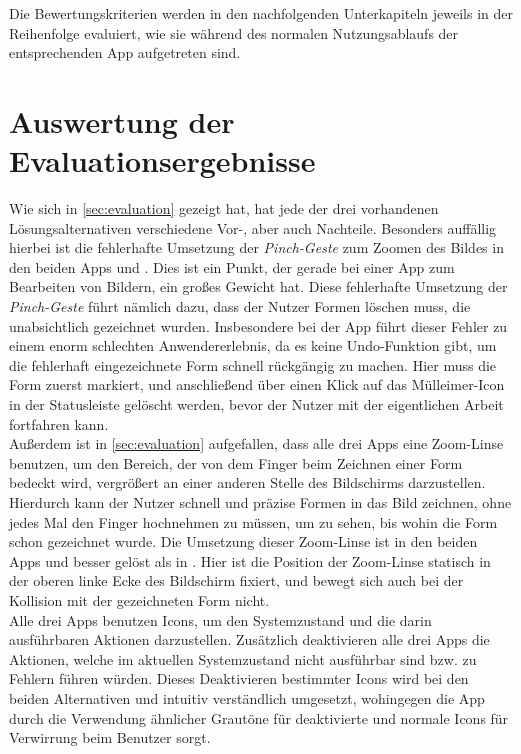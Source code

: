 Die Bewertungskriterien werden in den nachfolgenden Unterkapiteln jeweils in der Reihenfolge evaluiert, wie sie während des normalen Nutzungsablaufs der entsprechenden App aufgetreten sind.




\section{Auswertung der Evaluationsergebnisse}


Wie sich in \autoref{sec:evaluation} gezeigt hat, hat jede der drei vorhandenen Lösungsalternativen verschiedene Vor-, aber auch Nachteile.
Besonders auffällig hierbei ist die fehlerhafte Umsetzung der \emph{Pinch-Geste} zum Zoomen des Bildes in den beiden Apps \mm{} und \pm{}.
Dies ist ein Punkt, der gerade bei einer App zum Bearbeiten von Bildern, ein großes Gewicht hat.
Diese fehlerhafte Umsetzung der \emph{Pinch-Geste} führt nämlich dazu, dass der Nutzer Formen löschen muss, die unabsichtlich gezeichnet wurden.
Insbesondere bei der App \pm{} führt dieser Fehler zu einem enorm schlechten Anwendererlebnis, da es keine Undo-Funktion gibt, um die fehlerhaft eingezeichnete Form schnell rückgängig zu machen.
Hier muss die Form zuerst markiert, und anschließend über einen Klick auf das Mülleimer-Icon in der Statusleiste gelöscht werden, bevor der Nutzer mit der eigentlichen Arbeit fortfahren kann. \\

Außerdem ist in \autoref{sec:evaluation} aufgefallen, dass alle drei Apps eine Zoom-Linse benutzen, um den Bereich, der von dem Finger beim Zeichnen einer Form bedeckt wird, vergrößert an einer anderen Stelle des Bildschirms darzustellen.
Hierdurch kann der Nutzer schnell und präzise Formen in das Bild zeichnen, ohne jedes Mal den Finger hochnehmen zu müssen, um zu sehen, bis wohin die Form schon gezeichnet wurde.
Die Umsetzung dieser Zoom-Linse ist in den beiden Apps \mm{} und \pm{} besser gelöst als in \im{}.
Hier ist die Position der Zoom-Linse statisch in der oberen linke Ecke des Bildschirm fixiert, und bewegt sich auch bei der Kollision mit der gezeichneten Form nicht. \\

Alle drei Apps benutzen Icons, um den Systemzustand und die darin ausführbaren Aktionen darzustellen.
Zusätzlich deaktivieren alle drei Apps die Aktionen, welche im aktuellen Systemzustand nicht ausführbar sind bzw. zu Fehlern führen würden.
Dieses Deaktivieren bestimmter Icons wird bei den beiden Alternativen \mm{} und \pm{} intuitiv verständlich umgesetzt, wohingegen die App \im{} durch die Verwendung ähnlicher Grautöne für deaktivierte und normale Icons für Verwirrung beim Benutzer sorgt. \\

